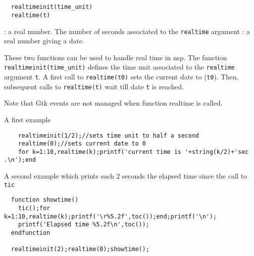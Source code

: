 %
%
\begin{mandesc}
   \\
   \\
\end{mandesc}
\label{realtimeinit}
\label{realtime}
\begin{calling_sequence}
\begin{verbatim}
  realtimeinit(time_unit)
  realtime(t)
\end{verbatim}
\end{calling_sequence}
\begin{parameters}
  \begin{varlist}
    : a real number. The number of seconds associated to the \verb!realtime! argument
    : a real number giving a date.
  \end{varlist}
\end{parameters}
\begin{mandescription}
  These two functions can be used to handle real time in nsp.
  The function \verb!realtimeinit(time_unit)! defines the time unit
  associated to the \verb!realtime! argument \verb!t!. A first call to
  \verb!realtime(t0)! sets the current date to (\verb!t0!). Then,
  subsequent calls to \verb!realtime(t)! wait till date \verb!t! is
  reached.

  Note that Gtk events are not managed when function realtime is called.
\end{mandescription}
\begin{examples}

\noindent A first example
  \begin{Verbatim}
    realtimeinit(1/2);//sets time unit to half a second
    realtime(0);//sets current date to 0
    for k=1:10,realtime(k);printf('current time is '+string(k/2)+'sec .\n');end
  \end{Verbatim}

\noindent A second example which prints each 2 seconds the elapsed time since
the call to \verb!tic!
\begin{Verbatim}
  function showtime()
    tic();for k=1:10,realtime(k);printf('\r%5.2f',toc());end;printf('\n');
    printf('Elapsed time %5.2f\n',toc());
  endfunction

  realtimeinit(2);realtime(0);showtime();
\end{Verbatim}
\end{examples}
